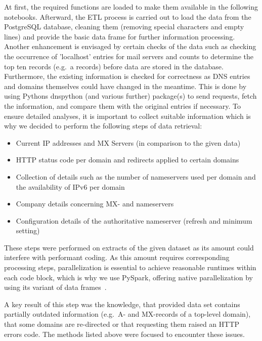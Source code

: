 At first, the required functions are loaded to make them available in the following notebooks.
Afterward, the ETL process is carried out to load the data from the PostgreSQL database, cleaning them (removing special characters and empty lines) and provide the basic data frame for further information processing.
Another enhancement is envisaged by certain checks of the data such as checking the occurrence of 'localhost' entries for mail servers and counts to determine the top ten records (e.g.\ a records) before data are stored in the database.
Furthermore, the existing information is checked for correctness as DNS entries and domains themselves could have changed in the meantime.
This is done by using Pythons dnspython (and various further) package(s) to send requests, fetch the information, and compare them with the original entries if necessary.
To ensure detailed analyses, it is important to collect suitable information which is why we decided to perform the following steps of data retrieval:
\begin{itemize}
    \item Current IP addresses and MX Servers (in comparison to the given data)
    \item HTTP status code per domain and redirects applied to certain domains
    \item Collection of details such as the number of nameservers used per domain and the availability of IPv6 per domain
    \item Company details concerning MX- and nameservers
    \item Configuration details of the authoritative nameserver (refresh and minimum setting)
\end{itemize}
These steps were performed on extracts of the given dataset as its amount could interfere with performant coding.
As this amount requires corresponding processing steps, parallelization is essential to achieve reasonable runtimes within each code block, which is why we use PySpark, offering native parallelization by using its variant of data frames~\autocite[cf.][]{Weber.2019}.

A key result of this step was the knowledge, that provided data set contains partially outdated information (e.g.\ A- and MX-records of a top-level domain), that some domains are re-directed or that requesting them raised an HTTP errors code.
The methods listed above were focused to encounter these issues.

